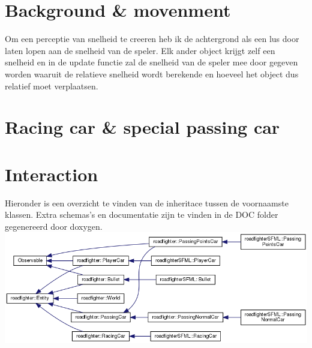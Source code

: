 \documentclass[12pt,a4paper]{article}
\begin{document}
\section{Background \& movenment}
Om een perceptie van snelheid te creeren heb ik de achtergrond als een lus door laten lopen aan de snelheid van de speler. Elk ander object krijgt zelf een snelheid en in de update functie zal de snelheid van de speler mee door gegeven worden waaruit de relatieve snelheid wordt berekende en hoeveel het object dus relatief moet verplaatsen.

\section{Racing car \& special passing car}


\section{Interaction}
Hieronder is een overzicht te vinden van de inheritace tussen de voornaamste klassen. Extra schemas's en documentatie zijn te vinden in de DOC folder gegenereerd door doxygen.\\
\includegraphics[scale=0.5]{img/inherit_graph_2.png}
\end{document}
